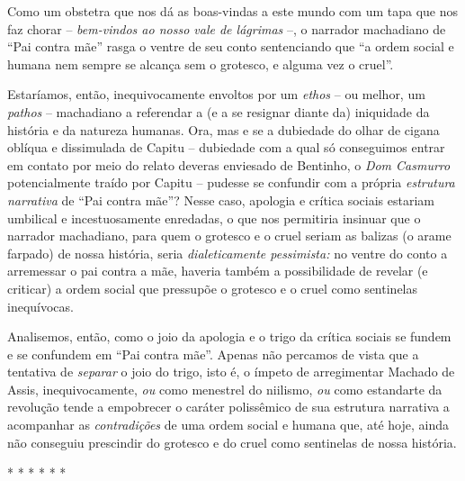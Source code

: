 Como um obstetra que nos dá as boas-vindas a este mundo com um tapa que
nos faz chorar -- \emph{bem-vindos ao nosso vale de lágrimas} --, o
narrador machadiano de ``Pai contra mãe'' rasga o ventre de seu conto
sentenciando que ``a ordem social e humana nem sempre se alcança sem o
grotesco, e alguma vez o cruel''.

Estaríamos, então, inequivocamente envoltos por um \emph{ethos} -- ou
melhor, um \emph{pathos} -- machadiano a referendar a (e a se resignar
diante da) iniquidade da história e da natureza humanas. Ora, mas e se a
dubiedade do olhar de cigana oblíqua e dissimulada de Capitu --
dubiedade com a qual só conseguimos entrar em contato por meio do relato
deveras enviesado de Bentinho, o \emph{Dom Casmurro} potencialmente
traído por Capitu -- pudesse se confundir com a própria \emph{estrutura
narrativa} de ``Pai contra mãe''? Nesse caso, apologia e crítica sociais
estariam umbilical e incestuosamente enredadas, o que nos permitiria
insinuar que o narrador machadiano, para quem o grotesco e o cruel
seriam as balizas (o arame farpado) de nossa história, seria
\emph{dialeticamente pessimista:} no ventre do conto a arremessar o pai
contra a mãe, haveria também a possibilidade de revelar (e criticar) a
ordem social que pressupõe o grotesco e o cruel como sentinelas
inequívocas.

Analisemos, então, como o joio da apologia e o trigo da crítica sociais
se fundem e se confundem em ``Pai contra mãe''. Apenas não percamos de
vista que a tentativa de \emph{separar} o joio do trigo, isto é, o
ímpeto de arregimentar Machado de Assis, inequivocamente, \emph{ou} como
menestrel do niilismo, \emph{ou} como estandarte da revolução tende a
empobrecer o caráter polissêmico de sua estrutura narrativa a acompanhar
as \emph{contradições} de uma ordem social e humana que, até hoje, ainda
não conseguiu prescindir do grotesco e do cruel como sentinelas de nossa
história.

* * * * * *

